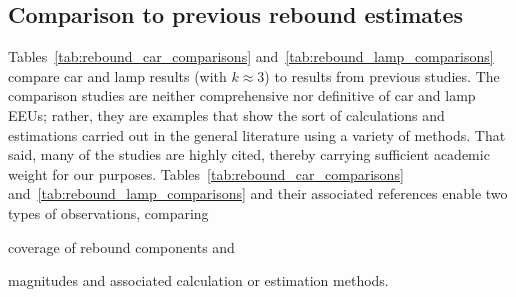\documentclass[12pt]{article}\usepackage[]{graphicx}\usepackage[]{xcolor}
\begin{document}
\subsection{Comparison to previous rebound estimates} 
\label{sec:comparison_to_other_rebound_estimates}

Tables~\ref{tab:rebound_car_comparisons} and~\ref{tab:rebound_lamp_comparisons}
compare car and lamp results (with $k \approx 3$) to 
results from previous studies.
The comparison studies are neither comprehensive nor
definitive of car and lamp EEUs; 
rather, they are examples that show the sort of calculations and estimations
carried out in the general literature using a variety of methods. 
That said, many of the studies are highly cited,
thereby carrying sufficient academic weight for our purposes.
Tables~\ref{tab:rebound_car_comparisons} and~\ref{tab:rebound_lamp_comparisons}
and their associated references 
enable two types of observations, comparing
%
\begin{enumerate*}[label={(\roman*)}]
	
  \item coverage of rebound components and
  
  \item magnitudes and associated calculation or estimation methods.
    
\end{enumerate*}


\end{document}
